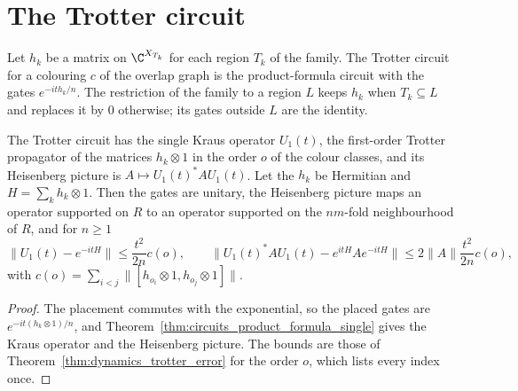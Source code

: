 \section{The Trotter circuit}
\label{sec:circuits_trotter}

\begin{definition}
    \label{def:circuits_trotter}
    \leanok
    Let $h_k$ be a matrix on $\C^{X_{T_k}}$ for each region $T_k$ of the family. The
    Trotter circuit for a colouring $c$ of the overlap graph is the product-formula
    circuit with the gates $e^{-ith_k/n}$. The restriction of the family to a region
    $L$ keeps $h_k$ when $T_k\subseteq L$ and replaces it by $0$ otherwise; its gates
    outside $L$ are the identity.
\end{definition}

\begin{theorem}
    \label{thm:circuits_trotter}
    \leanok
    The Trotter circuit has the single Kraus operator $U_1(t)$, the first-order Trotter
    propagator of the matrices $h_k\otimes1$ in the order $o$ of the colour classes,
    and its Heisenberg picture is $A\mapsto U_1(t)^*AU_1(t)$. Let the $h_k$ be
    Hermitian and $H=\sum_kh_k\otimes1$. Then the gates are unitary, the Heisenberg
    picture maps an operator supported on $R$ to an operator supported on the
    $nm$-fold neighbourhood of $R$, and for $n\geq1$
    \[
        \lVert U_1(t)-e^{-itH}\rVert\leq\frac{t^2}{2n}c(o),\qquad
        \lVert U_1(t)^*AU_1(t)-e^{itH}Ae^{-itH}\rVert\leq2\lVert A\rVert\frac{t^2}{2n}c(o),
    \]
    with $c(o)=\sum_{i<j}\lVert[h_{o_i}\otimes1,h_{o_j}\otimes1]\rVert$.
\end{theorem}
\begin{proof}\leanok
    The placement commutes with the exponential, so the placed gates are
    $e^{-it(h_k\otimes1)/n}$, and Theorem~\ref{thm:circuits_product_formula_single}
    gives the Kraus operator and the Heisenberg picture. The bounds are those of
    Theorem~\ref{thm:dynamics_trotter_error} for the order $o$, which lists every index
    once.
\end{proof}

